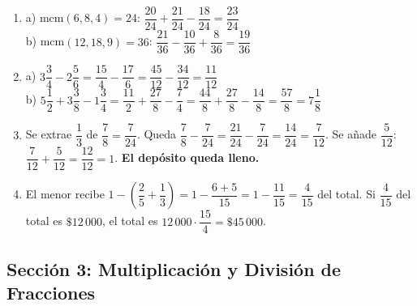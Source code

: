 \documentclass[12pt, letterpaper]{article}
\begin{document}
  \begin{enumerate}[leftmargin=*, label=\textbf{\arabic*.}]
    \item
          a) mcm$(6,8,4) = 24$: $\dfrac{20}{24} + \dfrac{21}{24} - \dfrac{18}{24} = \dfrac{23}{24}$ \\[2pt]
          b) mcm$(12,18,9) = 36$: $\dfrac{21}{36} - \dfrac{10}{36} + \dfrac{8}{36} = \dfrac{19}{36}$

    \item
          a) $3\dfrac{3}{4} - 2\dfrac{5}{6} = \dfrac{15}{4} - \dfrac{17}{6} = \dfrac{45}{12} - \dfrac{34}{12} = \dfrac{11}{12}$ \\[2pt]
          b) $5\dfrac{1}{2} + 3\dfrac{3}{8} - 1\dfrac{3}{4} = \dfrac{11}{2} + \dfrac{27}{8} - \dfrac{7}{4} = \dfrac{44}{8} + \dfrac{27}{8} - \dfrac{14}{8} = \dfrac{57}{8} = 7\dfrac{1}{8}$

    \item Se extrae $\dfrac{1}{3}$ de $\dfrac{7}{8} = \dfrac{7}{24}$. Queda $\dfrac{7}{8} - \dfrac{7}{24} = \dfrac{21}{24} - \dfrac{7}{24} = \dfrac{14}{24} = \dfrac{7}{12}$.
          Se añade $\dfrac{5}{12}$: $\dfrac{7}{12} + \dfrac{5}{12} = \dfrac{12}{12} = 1$. \textbf{El depósito queda lleno.}

    \item El menor recibe $1 - \left(\dfrac{2}{5} + \dfrac{1}{3}\right) = 1 - \dfrac{6 + 5}{15} = 1 - \dfrac{11}{15} = \dfrac{4}{15}$ del total.
          Si $\dfrac{4}{15}$ del total es $\$12\,000$, el total es $12\,000 \cdot \dfrac{15}{4} = \$45\,000$.
  \end{enumerate}

  \newpage

  \subsection*{Sección 3: Multiplicación y División de Fracciones}
\end{document}
